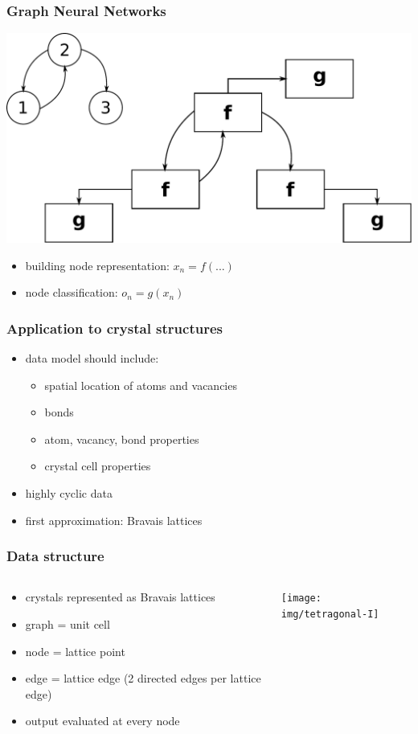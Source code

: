 \documentclass{beamer}
\begin{document}
\begin{frame}
\frametitle{Graph Neural Networks}
\begin{center}
	\includegraphics[scale=0.4]{img/encodinginc}
\end{center}
\begin{itemize}
	\item building node representation: $x_n = f(...)$
	\item node classification: $o_n = g(x_n)$
\end{itemize}
\end{frame}

\begin{frame}
\frametitle{Application to crystal structures}
\begin{itemize}
	\item data model should include: \begin{itemize}
		\item spatial location of atoms and vacancies
		\item bonds
		\item atom, vacancy, bond properties
		\item crystal cell properties
	\end{itemize}
	\item highly cyclic data
	\item first approximation: Bravais lattices
\end{itemize}
\end{frame}


\begin{frame}
\frametitle{Data structure}
\begin{columns}
	\begin{column}{0.66\textwidth}
		\begin{itemize}
			\item crystals represented as Bravais lattices
			\item graph = unit cell
			\item node = lattice point
			\item edge = lattice edge (2 directed edges per lattice edge)
			\item output evaluated at every node
		\end{itemize}
	\end{column}
	\begin{column}{0.34\textwidth}
		\texttt{[image: img/tetragonal-I]}
	\end{column}
\end{columns}
\end{frame}
\end{document}
